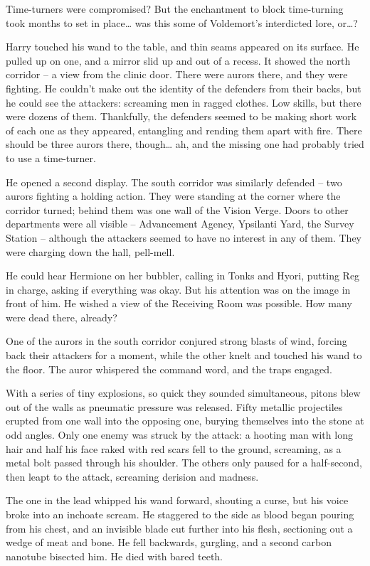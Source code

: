 Time-turners were compromised? But the enchantment to block time-turning
took months to set in place\ldots{} was this some of Voldemort's
interdicted lore, or\ldots?

Harry touched his wand to the table, and thin seams appeared on its
surface. He pulled up on one, and a mirror slid up and out of a recess.
It showed the north corridor -- a view from the clinic door. There were
aurors there, and they were fighting. He couldn't make out the identity
of the defenders from their backs, but he could see the attackers:
screaming men in ragged clothes. Low skills, but there were dozens of
them. Thankfully, the defenders seemed to be making short work of each
one as they appeared, entangling and rending them apart with fire. There
should be three aurors there, though\ldots{} ah, and the missing one had
probably tried to use a time-turner.

He opened a second display. The south corridor was similarly defended --
two aurors fighting a holding action. They were standing at the corner
where the corridor turned; behind them was one wall of the Vision Verge.
Doors to other departments were all visible -- Advancement Agency,
Ypsilanti Yard, the Survey Station -- although the attackers seemed to
have no interest in any of them. They were charging down the hall,
pell-mell.

He could hear Hermione on her bubbler, calling in Tonks and Hyori,
putting Reg in charge, asking if everything was okay. But his attention
was on the image in front of him. He wished a view of the Receiving Room
was possible. How many were dead there, already?

One of the aurors in the south corridor conjured strong blasts of wind,
forcing back their attackers for a moment, while the other knelt and
touched his wand to the floor. The auror whispered the command word, and
the traps engaged.

With a series of tiny explosions, so quick they sounded simultaneous,
pitons blew out of the walls as pneumatic pressure was released. Fifty
metallic projectiles erupted from one wall into the opposing one,
burying themselves into the stone at odd angles. Only one enemy was
struck by the attack: a hooting man with long hair and half his face
raked with red scars fell to the ground, screaming, as a metal bolt
passed through his shoulder. The others only paused for a half-second,
then leapt to the attack, screaming derision and madness.

The one in the lead whipped his wand forward, shouting a curse, but his
voice broke into an inchoate scream. He staggered to the side as blood
began pouring from his chest, and an invisible blade cut further into
his flesh, sectioning out a wedge of meat and bone. He fell backwards,
gurgling, and a second carbon nanotube bisected him. He died with bared
teeth.

